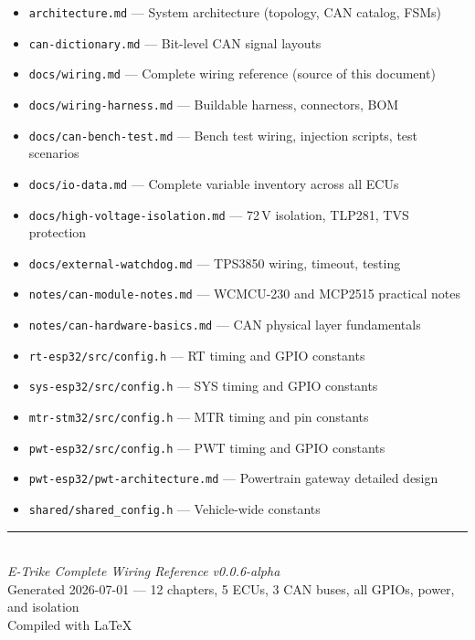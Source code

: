 \documentclass[12pt,a4paper,oneside]{report}
\begin{document}
\begin{itemize}[leftmargin=*,nosep]
  \item \texttt{architecture.md} --- System architecture (topology, CAN catalog, FSMs)
  \item \texttt{can-dictionary.md} --- Bit-level CAN signal layouts
  \item \texttt{docs/wiring.md} --- Complete wiring reference (source of this document)
  \item \texttt{docs/wiring-harness.md} --- Buildable harness, connectors, BOM
  \item \texttt{docs/can-bench-test.md} --- Bench test wiring, injection scripts, test scenarios
  \item \texttt{docs/io-data.md} --- Complete variable inventory across all ECUs
  \item \texttt{docs/high-voltage-isolation.md} --- 72\,V isolation, TLP281, TVS protection
  \item \texttt{docs/external-watchdog.md} --- TPS3850 wiring, timeout, testing
  \item \texttt{notes/can-module-notes.md} --- WCMCU-230 and MCP2515 practical notes
  \item \texttt{notes/can-hardware-basics.md} --- CAN physical layer fundamentals
  \item \texttt{rt-esp32/src/config.h} --- RT timing and GPIO constants
  \item \texttt{sys-esp32/src/config.h} --- SYS timing and GPIO constants
  \item \texttt{mtr-stm32/src/config.h} --- MTR timing and pin constants
  \item \texttt{pwt-esp32/src/config.h} --- PWT timing and GPIO constants
  \item \texttt{pwt-esp32/pwt-architecture.md} --- Powertrain gateway detailed design
  \item \texttt{shared/shared\_config.h} --- Vehicle-wide constants
\end{itemize}

\vfill

\begin{center}
  \rule{0.5\textwidth}{0.4pt}\\[4mm]
  {\small\textit{E-Trike Complete Wiring Reference v0.0.6-alpha}}\\[2mm]
  {\small Generated 2026-07-01 --- 12 chapters, 5 ECUs, 3 CAN buses, all GPIOs, power, and isolation}\\[2mm]
  {\small Compiled with \LaTeX}
\end{center}
\end{document}

